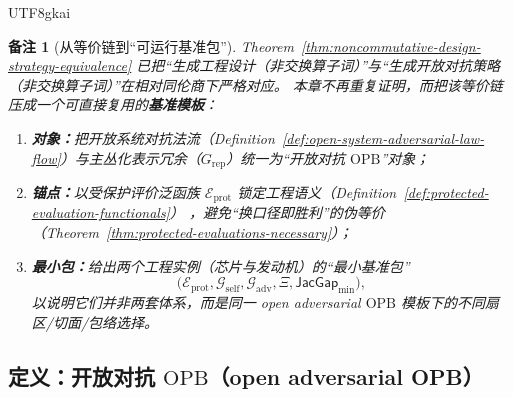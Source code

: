 \documentclass[12pt]{article}
\newtheorem{remark}{备注}[section]
\newcommand{\JacGap}{\ensuremath{\mathsf{JacGap}}}
\newcommand{\OPB}{\ensuremath{\mathrm{OPB}}}
\begin{document}
\begin{CJK*}{UTF8}{gkai}
\begin{remark}[从等价链到“可运行基准包”]
Theorem~\ref{thm:noncommutative-design-strategy-equivalence} 已把“生成工程设计（非交换算子词）”与“生成开放对抗策略（非交换算子词）”在相对同伦商下严格对应。
本章不再重复证明，而把该等价链压成一个可直接复用的\textbf{基准模板}：
\begin{enumerate}
  \item \textbf{对象：}把开放系统对抗法流（Definition~\ref{def:open-system-adversarial-law-flow}）与主丛化表示冗余（$G_{\mathrm{rep}}$）统一为“开放对抗
    \OPB{}”对象；
  \item \textbf{锚点：}以受保护评价泛函族 $\mathcal{E}_{\mathrm{prot}}$ 锁定工程语义（Definition~\ref{def:protected-evaluation-functionals}）
    ，避免“换口径即胜利”的伪等价（Theorem~\ref{thm:protected-evaluations-necessary}）；
  \item \textbf{最小包：}给出两个工程实例（芯片与发动机）的“最小基准包”
  \[
  \bigl(
    \mathcal{E}_{\mathrm{prot}},
    \mathcal{G}_{\mathrm{self}},
    \mathcal{G}_{\mathrm{adv}},
    \Xi,
    \JacGap_{\min}
  \bigr),
  \]
  以说明它们并非两套体系，而是同一 open adversarial \OPB{} 模板下的不同扇区/切面/包络选择。
\end{enumerate}
\end{remark}

\subsection{定义：开放对抗 \OPB{}（open adversarial OPB）}


\end{CJK*}
\end{document}
